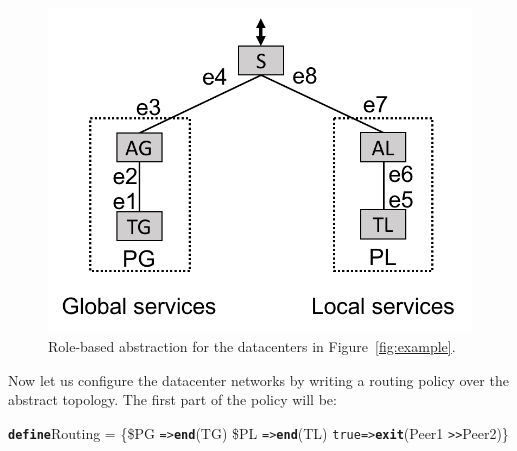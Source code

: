\documentclass{sig-alternate-10pt}
\newcommand{\sysname}{{\small \sf Methane}\xspace}
\newcommand{\CD}[1]{\texttt{\small #1}}  %
\newcommand{\KW}[1]{\texttt{\small\bfseries{#1}}}
\newcommand{\True}{\CD{true}}
\newcommand{\Define}{\KW{define}}
\newcommand{\Prefer}{\texttt{>>}}
\newcommand{\Path}{\texttt{=>}}
\newcommand{\Exit}{\KW{exit}}
\newcommand{\End}{\KW{end}}
\begin{document}
%


\begin{figure}[t!]
  \centering
  \includegraphics[width=.7\columnwidth]{figures/example3}
  \caption{Role-based abstraction for the datacenters in Figure~\ref{fig:example}.}
  \label{fig:example3}
  \vspace{-1em}
\end{figure}


Now let us configure the datacenter networks by writing a routing policy over the
abstract topology. The first part of the policy will be:
%
\begin{code}
\Define Routing =
    \{\$PG \Path \End(TG)
     \$PL \Path \End(TL)
     \True \Path \Exit(Peer1 \Prefer Peer2)\}
\end{code}
\noindent%
\end{document}
